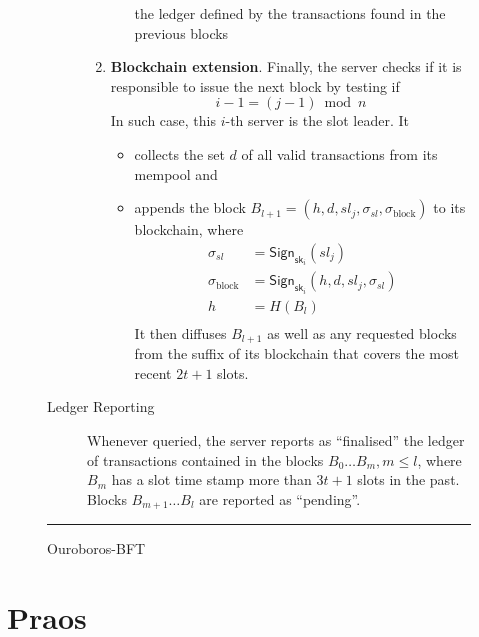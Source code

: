 \begin{figure}
\begin{description}
\begin{enumerate}
\begin{enumerate}
    the ledger defined by the transactions found in the previous blocks
  \end{enumerate}
%
  \item \textbf{Blockchain extension}.\label{bft:extension} Finally, the server
  checks if it is responsible to issue the next block by testing if
%
  \begin{equation}
    i - 1 = (j - 1) \bmod n
  \label{bft:leadershipcheck}
  \end{equation}
%
  In such case, this $i$-th server is the slot leader. It
%
  \begin{itemize}
    \item collects the set $d$ of all valid transactions from its mempool and
    \item appends the block $B_{l+1} = (h, d, \mathit{sl}_j, \sigma_\mathit{sl}, \sigma_\mathrm{block})$ to its blockchain, where
    \begin{equation*}
      \begin{split}
      \sigma_\mathit{sl}    & = \mathsf{Sign}_{\mathsf{sk}_i}(\mathit{sl}_j) \\
      \sigma_\mathrm{block} & = \mathsf{Sign}_{\mathsf{sk}_i}(h, d, \mathit{sl}_j, \sigma_\mathit{sl}) \\
      h                     & = H(B_l) \\
      \end{split}
    \end{equation*}
    It then diffuses $B_{l+1}$ as well as any requested blocks from the suffix of its blockchain that covers the most recent $2t + 1$ slots.
    \end{itemize}

  \end{enumerate}

  \item[Ledger Reporting] Whenever queried, the server reports as ``finalised'' the ledger of transactions contained in the blocks $B_0 \ldots B_m, m \le l$, where $B_m$ has a slot time stamp more than $3t + 1$ slots in the past. Blocks $B_{m+1} \ldots B_l$ are reported as ``pending''.
\end{description}

\hrule
\caption{\label{figure:bft}Ouroboros-BFT \cite[Figure 1]{cryptoeprint:2018:1049}}
\end{figure}

\section{Praos}
\label{praos}

